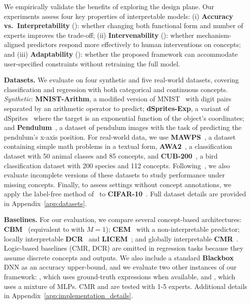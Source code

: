 \documentclass{article}
\theoremstyle{plain}
\theoremstyle{definition}
\theoremstyle{remark}
\newcommand{\mypar}[1]{\noindent\textbf{#1}}
\begin{document}
We empirically validate the benefits of exploring the design plane. Our experiments assess four key properties of interpretable models: (i) \textbf{Accuracy vs.\ Interpretability} (): whether changing both functional form and number of experts improves the \ai{} trade-off; 
(ii) \textbf{Intervenability} (): whether mechanism-aligned predictors respond more effectively to human interventions on concepts; 
and (iii) \textbf{Adaptability} (): whether the proposed framework can accommodate user-specified constraints without retraining the full model.  


\mypar{Datasets.}
We evaluate on four synthetic and five real-world datasets, covering classification and regression with both categorical and continuous concepts. \emph{Synthetic}: \textbf{MNIST-Arithm}, a modified version of MNIST~\citep{lecun2010} with digit pairs separated by an arithmetic operator to predict; \textbf{dSprites-Exp}, a variant of dSprites~\citep{dsprites17} where the target is an exponential function of the object’s coordinates; and \textbf{Pendulum}~\citep{yang2020}, a dataset of pendulum images with the task of predicting the pendulum's x-axis position. 
For real-world data, we use \textbf{MAWPS}~\citep{koncel2016mawps}, a dataset containing simple math problems in a textual form, \textbf{AWA2}~\citep{xian2017}, a classification dataset with 50 animal classes and 85 concepts, and \textbf{CUB-200}~\citep{he2019fine}, a bird classification dataset with 200 species and 112 concepts. Following~\citet{zarlenga2025avoiding}, we also evaluate incomplete versions of these datasets to study performance under missing concepts. Finally, to assess settings without concept annotations, we apply the label-free method of~\citet{oikarinen2023label} to \textbf{CIFAR-10}~\citep{krizhevsky2009}. Full dataset details are provided in Appendix~\ref{app:datasets}.

\mypar{Baselines.}
For our evaluation, we compare several concept-based architectures: \textbf{CBM}~\citep{koh2020concept} (equivalent to \linear{} with $M{=}1$); \textbf{CEM}~\citep{zarlenga2022concept} with a non-interpretable predictor; locally interpretable \textbf{DCR}~\citep{barbiero2023} and \textbf{LICEM}~\citep{de2025}; and globally interpretable \textbf{CMR}~\citep{debot2024interpretable}. Logic-based baselines (CMR, DCR) are omitted in regression tasks because they assume discrete concepts and outputs. We also include a standard \textbf{Blackbox} DNN as an accuracy upper-bound, and we evaluate two other instances of our framework: \textbf{\prior{}}, which uses ground-truth expressions when available, and \textbf{\mlp{}}, which uses a mixture of MLPs. CMR and \classacro{} are tested with 1-5 experts. Additional details in Appendix~\ref{app:implementation_details}.
\end{document}
